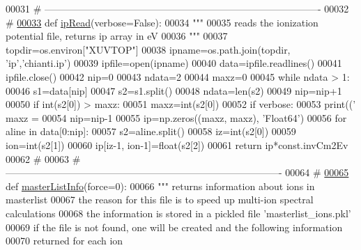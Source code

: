 \begin{DoxyCode}
00031     \textcolor{comment}{# -------------------------------------------------------------------------------------}
00032     \textcolor{comment}{#}
\hypertarget{__chianti__tools_8py_source_l00033}{}\hyperlink{namespacepyneb_1_1utils_1_1__chianti__tools_addc139edf6069387aed0049344002b13}{00033} \textcolor{keyword}{def }\hyperlink{namespacepyneb_1_1utils_1_1__chianti__tools_addc139edf6069387aed0049344002b13}{ipRead}(verbose=False):
00034     \textcolor{stringliteral}{"""}
00035 \textcolor{stringliteral}{    reads the ionization potential file, returns ip array in eV}
00036 \textcolor{stringliteral}{    """}
00037     topdir=os.environ[\textcolor{stringliteral}{"XUVTOP"}]
00038     ipname=os.path.join(topdir, \textcolor{stringliteral}{'ip'},\textcolor{stringliteral}{'chianti.ip'})
00039     ipfile=open(ipname)
00040     data=ipfile.readlines()
00041     ipfile.close()
00042     nip=0
00043     ndata=2
00044     maxz=0
00045     \textcolor{keywordflow}{while} ndata > 1:
00046         s1=data[nip]
00047         s2=s1.split()
00048         ndata=len(s2)
00049         nip=nip+1
00050         \textcolor{keywordflow}{if} int(s2[0]) > maxz:
00051             maxz=int(s2[0])
00052     \textcolor{keywordflow}{if} verbose:
00053         print((\textcolor{stringliteral}{' maxz = %
00054     nip=nip-1
00055     ip=np.zeros((maxz, maxz), \textcolor{stringliteral}{'Float64'})
00056     \textcolor{keywordflow}{for} aline \textcolor{keywordflow}{in} data[0:nip]:
00057         s2=aline.split()
00058         iz=int(s2[0])
00059         ion=int(s2[1])
00060         ip[iz-1, ion-1]=float(s2[2])
00061     \textcolor{keywordflow}{return} ip*const.invCm2Ev
00062     \textcolor{comment}{#}
00063     \textcolor{comment}{# -------------------------------------------------------------------------------------}
00064     \textcolor{comment}{#}
\hypertarget{__chianti__tools_8py_source_l00065}{}\hyperlink{namespacepyneb_1_1utils_1_1__chianti__tools_a5677fc0d50bd22a853c14b4b2606b89e}{00065} \textcolor{keyword}{def }\hyperlink{namespacepyneb_1_1utils_1_1__chianti__tools_a5677fc0d50bd22a853c14b4b2606b89e}{masterListInfo}(force=0):
00066     \textcolor{stringliteral}{""" returns information about ions in masterlist}
00067 \textcolor{stringliteral}{    the reason for this file is to speed up multi-ion spectral calculations}
00068 \textcolor{stringliteral}{    the information is stored in a pickled file 'masterlist\_ions.pkl'}
00069 \textcolor{stringliteral}{    if the file is not found, one will be created and the following information}
00070 \textcolor{stringliteral}{    returned for each ion}
}
\end{DoxyCode}
